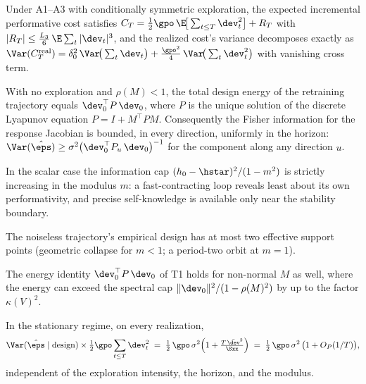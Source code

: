 
\begin{lemma}
Under A1--A3 with conditionally symmetric exploration, the expected
incremental performative cost satisfies
$C_T = \tfrac{1}{2}\gpo\,\E\!\big[\sum_{t\le T}\dev_t^2\big] + R_T$ with
$|R_T| \le \tfrac{L_3}{6}\,\E\sum_t |\dev_t|^3$, and the realized cost's
variance decomposes exactly as
$\Var(C_T^{\mathrm{real}}) = \delta_0^2\,\Var\!\big(\sum_t \dev_t\big)
+ \tfrac{\gpo^2}{4}\,\Var\!\big(\sum_t \dev_t^2\big)$
with vanishing cross term.
\end{lemma}

\begin{theorem}
With no exploration and $\rho(M)<1$, the total design energy of the
retraining trajectory equals $\dev_0^\top P\,\dev_0$, where $P$ is the
unique solution of the discrete Lyapunov equation $P = I + M^\top P M$.
Consequently the Fisher information for the response Jacobian is bounded,
in every direction, uniformly in the horizon:
$\Var(\hat\eps) \ge \sigma^2\big(\dev_0^\top P_u\,\dev_0\big)^{-1}$ for the
component along any direction $u$.
\end{theorem}

\begin{corollary}
In the scalar case the information cap $(h_0-\hstar)^2/(1-m^2)$ is strictly
increasing in the modulus $m$: a fast-contracting loop reveals least about
its own performativity, and precise self-knowledge is available only near
the stability boundary.
\end{corollary}

\begin{corollary}
The noiseless trajectory's empirical design has at most two effective
support points (geometric collapse for $m<1$; a period-two orbit at
$m=1$).
\end{corollary}

\begin{remark}
The energy identity $\dev_0^\top P\,\dev_0$ of T1 holds for non-normal $M$
as well, where the energy can exceed the spectral cap
$\|\dev_0\|^2/(1-\rho(M)^2)$ by up to the factor $\kappa(V)^2$.
\end{remark}

\begin{theorem}
In the stationary regime, on every realization,
\[
\Var(\hat\eps \mid \mathrm{design}) \times \tfrac{1}{2}\gpo \sum_{t\le T}
\dev_t^2 \;=\; \tfrac{1}{2}\,\gpo\,\sigma^2\Big(1 +
\tfrac{T\,\bar{\dev}^2}{\Sxx}\Big)
\;=\; \tfrac{1}{2}\,\gpo\,\sigma^2\,\big(1 + O_P(1/T)\big),
\]
independent of the exploration intensity, the horizon, and the modulus.
\end{theorem}


